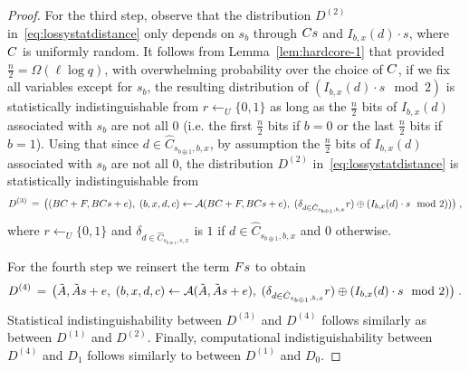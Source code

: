 \begin{proof}
For the third step, observe that the distribution ${D}^{(2)}$ in~\eqref{eq:lossystatdistance} only depends on $s_b$ through $\*C\*s$ and $I_{b,x}(d)\cdot s$, where $\*C$ is uniformly random. It follows from Lemma~\ref{lem:hardcore-1} that provided $\frac{n}{2}=\Omega(\ell\log q)$, with overwhelming probability over the choice of $\*C$, if we fix all variables except for $s_b$, the resulting distribution of $(I_{b,x}(d) \cdot s \mod 2)$ is statistically indistinguishable from $r\leftarrow_U \{0,1\}$ as long as the $\frac{n}{2}$ bits of  $I_{b,x}(d)$ associated with $s_b$ are not all $0$ (i.e. the first $\frac{n}{2}$ bits if $b = 0$ or the last $\frac{n}{2}$ bits if $b = 1$). Using that since $d\in \hat{C}_{s_{b\oplus 1},b,x}$, by assumption the $\frac{n}{2}$ bits of  $I_{b,x}(d)$ associated with $s_b$ are not all $0$,  the distribution 
 ${D}^{(2)}$ in~\eqref{eq:lossystatdistance} is statistically indistinguishable from 
\begin{eqnarray}\label{eq:distreplacewithr}
{D}^{(3)} \,=\,\big( (\*B\*C+\*F, \*B\*C\*s + \*e),\; (b,x,d,c)\leftarrow \mathcal{A}(\*B\*C + \*F,\*B\*C\*s + \*e),\; (\delta_{d\in \hat{C}_{s_{b\oplus 1},b,x}} r )\oplus (I_{b,x}(d)\cdot s\mod 2))\big)\;, 
\end{eqnarray}
where $r\leftarrow_U \{0,1\}$ and $\delta_{d\in \hat{C}_{s_{b\oplus 1},s,x}}$ is $1$ if $d\in \hat{C}_{s_{b\oplus 1},b,x}$ and $0$ otherwise. %


For the fourth step we reinsert the term $F\*s$ to obtain
\begin{eqnarray}\label{eq:distbacktolossy}
{D}^{(4)} \,=\, \big(\tilde{\*A}, \tilde{\*A}\*s + \*e,\; (b,x,d,c)\leftarrow \mathcal{A}(\tilde{\*A},\tilde{\*A}\*s + \*e),\; (\delta_{d\in \hat{C}_{s_{b\oplus 1},b,x}} r) \oplus (I_{b,x}(d) \cdot s\mod 2) \big)\;. 
\end{eqnarray}
Statistical indistinguishability between ${D}^{(3)}$ and ${D}^{(4)}$ follows similarly as between ${D}^{(1)}$ and ${D}^{(2)}$.
Finally, computational indistiguishability between ${D}^{(4)}$ and ${D}_1$ follows similarly to between ${D}^{(1)}$ and ${D}_0$.
\end{proof}



